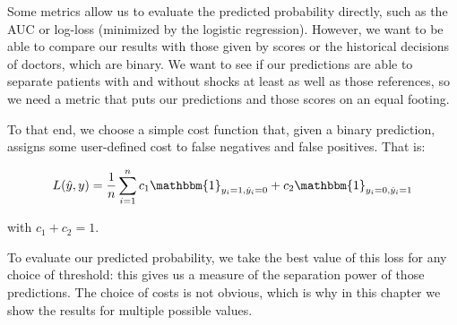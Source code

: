 Some metrics allow us to evaluate the predicted probability directly, such as the AUC \cite{huang2005AUC} or log-loss (minimized by the logistic regression). However, we want to be able to compare our results with those given by scores or the historical decisions of doctors, which are binary. We want to see if our predictions are able to separate patients with and without shocks at least as well as those references, so we need a metric that puts our predictions and those scores on an equal footing.

To that end, we choose a simple cost function that, given a binary prediction, assigns some user-defined cost to false negatives and false positives. That is:

$$ L(\hat{y}, y)=\frac{1}{n} \sum \limits_{i=1}^n c_1 \mathbbm{1}_{y_i=1,\hat{y}_i=0} + c_2 \mathbbm{1}_{y_i=0,\hat{y}_i=1}$$

with $c_1 + c_2 = 1$.

To evaluate our predicted probability, we take the best value of this loss for any choice of threshold: this gives us a measure of the separation power of those predictions. The choice of costs is not obvious, which is why in this chapter we show the results for multiple possible values.

